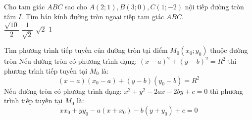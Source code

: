 \begin{vd}
	Cho tam giác $ABC$ sao cho $A(2;1), B(3;0), C(1;-2)$ nội tiếp đường tròn tâm $I$. Tìm bán kính đường tròn ngoại tiếp tam giác $ABC$.\\
\choice
{\True $\dfrac{\sqrt{10}}{2}$}
{$\dfrac{1}{\sqrt{2}}$}
{$\sqrt{2}$}
{$1$}
\end{vd}
\begin{dang}{Tìm phương trình tiếp tuyến của đường tròn tại điểm $M_0(x_0;y_0)$ thuộc đường tròn}
	Nếu đường tròn có phương trình dạng: $(x-a)^2+(y-b)^2=R^2$ thì phương trình tiếp tuyến tại $M_0$ là:
	$$(x-a)(x_0-a)+(y-b)(y_0-b)=R^2$$
	Nếu đường tròn có phương trình dạng: $x^2+y^2-2ax-2by+c=0$ thì phương trình tiếp tuyến tại $M_0$ là:
	$$xx_0+yy_0-a(x+x_0)-b(y+y_0)+c=0$$
\end{dang}
